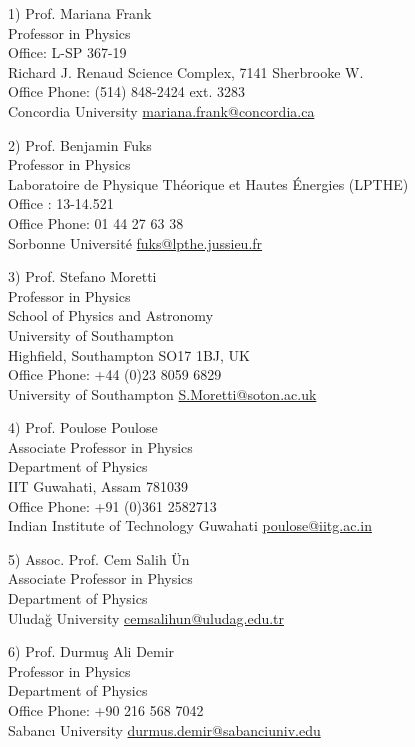 \documentclass[]{friggeri-cv}
\begin{document}
	\begin{entrylist}
		
		\entry
		{1)}
		{Prof. Mariana Frank \\ \normalfont
		Professor in Physics \\
		Office: 	L-SP 367-19 \\
		Richard J. Renaud Science Complex, 7141 Sherbrooke W. 	\\
		Office Phone: 	(514) 848-2424 ext. 3283 \\
		Concordia University}
		{\href{mariana.frank@concordia.ca}{mariana.frank@concordia.ca}} 
		

			
		\entry
		{2)}
		{Prof. Benjamin Fuks \\ \normalfont
		Professor in Physics \\	
		Laboratoire de Physique Théorique et Hautes Énergies (LPTHE) \\	
		Office : 	13-14.521 \\
		Office Phone: 	01 44 27 63 38	\\
		Sorbonne Université}
		{\href{fuks@lpthe.jussieu.fr}{fuks@lpthe.jussieu.fr}} 		
	
	    \entry
		{3)}
		{Prof. Stefano Moretti  \\ \normalfont
		Professor in Physics \\	
		School of Physics and Astronomy \\
		University of Southampton \\
		Highfield, Southampton SO17 1BJ, UK	\\
		Office Phone: 	+44 (0)23 8059 6829 \\
		University of Southampton}
		{\href{S.Moretti@soton.ac.uk}{S.Moretti@soton.ac.uk}} 			
	
		\entry
		{4)}
		{Prof. Poulose Poulose \\ \normalfont
		Associate Professor in Physics \\		
		Department of Physics \\
		IIT Guwahati, Assam 781039 \\
		Office Phone: +91 (0)361 2582713 \\			
		Indian Institute of Technology Guwahati}
		{\href{poulose@iitg.ac.in}{poulose@iitg.ac.in}} 					

	
	    \entry
		{5)}
		{Assoc. Prof. Cem Salih Ün  \\ \normalfont
		Associate Professor in Physics \\		
		Department of Physics \\			
		Uludağ University}
		{\href{cemsalihun@uludag.edu.tr}{cemsalihun@uludag.edu.tr}} 		

	    \entry
		{6)}
		{Prof. Durmuş Ali Demir  \\ \normalfont
		Professor in Physics \\		
		Department of Physics \\
	    Office Phone: +90 216 568 7042 \\						
		Sabancı University}
		{\href{durmus.demir@sabanciuniv.edu}{durmus.demir@sabanciuniv.edu}} 		


	\end{entrylist}
\end{document}
